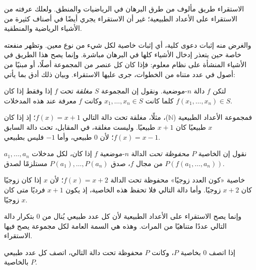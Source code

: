\documentclass[../../../include/open-logic-section]{subfiles}
\begin{document}


\begin{explain}
الاستقراء طريق مألوف من طرق البرهان في الرياضيات والمنطق. ولعلك عرفته من
الاستقراء على الأعداد الطبيعية؛ غير أن الاستقراء يجري أيضًا في أصناف
كثيرة من الأشياء الرياضية والمنطقية.

والغرض منه إثبات دعوى كلية، أي إثبات خاصية لكل شيء من نوع معين. وتظهر
منفعته خاصة حين يتعذر إدخال الأشياء كلها في البرهان مباشرة. وإنما يصح
هذا الطريق في الأشياء المنشأة على نظام معلوم: فإذا كان كل عنصر من
المجموعة أصلًا، أو مبنيًا من أصول في عدد متناه من الخطوات، جرى عليها
الاستقراء. وبيان ذلك أدق بما يأتي:
\end{explain}

\begin{defn}
لتكن $f$ دالة $n$-موضعية. ونقول إن المجموعة $S$ \emph{مغلقة} تحت $f$
إذا وفقط إذا كان $f(x_1,\dots,x_n) \in S$ كلما كانت
$x_1,\dots,x_n \in S$ وكانت $f$ معرفة عند هذه المدخلات.
\end{defn}

\begin{explain}
فمجموعة الأعداد الطبيعية ($\mathbb{N}$)، مثلًا، مغلقة تحت دالة التالي
$f(x) = x+1$؛ إذ إذا كان $x$ طبيعيًا كان $x+1$ طبيعيًا. وليست مغلقة،
في المقابل، تحت دالة السابق $f(x) = x-1$؛ لأن $0$ طبيعي، وأما $-1$
فليس بطبيعي.
\end{explain}

\begin{defn}
نقول إن الخاصية $P$ \emph{محفوظة تحت} الدالة $n$-موضعية $f$ إذا كان،
لكل مدخلات $a_1,\dots,a_n$ من مجال $f$، صدق
$P(a_1),\dots,P(a_n)$ مستلزمًا لصدق $P(f(a_1,\dots,a_n))$.
\end{defn}

\begin{explain}
خاصية «كون العدد زوجيًا» محفوظة تحت الدالة $f(x) = x+2$؛ لأن
$x$ إذا كان زوجيًا كان $x+2$ زوجيًا. وأما دالة التالي فلا تحفظ هذه
الخاصية، إذ يكون $x+1$ فرديًا متى كان $x$ زوجيًا.

وإنما يصح الاستقراء على الأعداد الطبيعية لأن كل عدد طبيعي يُنال من
$0$ بتكرار دالة التالي عددًا متناهيًا من المرات. وهذه هي السمة العامة
لكل مجموعة يصح فيها الاستقراء.
\end{explain}

\begin{defn}
إذا اتصف $0$ بخاصية $P$، وكانت $P$ محفوظة تحت دالة التالي، اتصف كل
عدد طبيعي بالخاصية $P$.
\end{defn}
\end{document}
